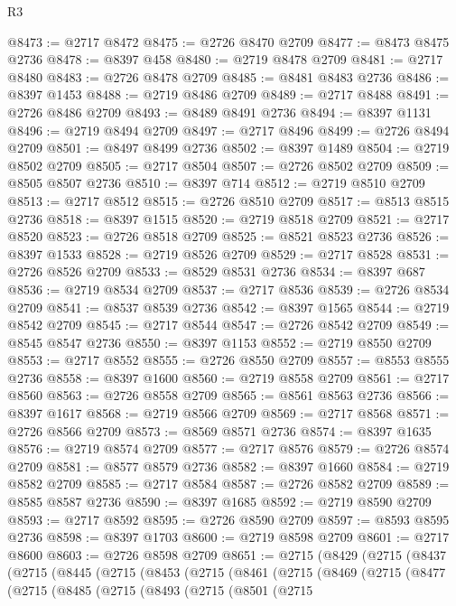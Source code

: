 \begin{lexlean}{R3}
\begin{coremodule}
@8473 := @2717 @8472
@8475 := @2726 @8470 @2709
@8477 := @8473 @8475 @2736
@8478 := @8397 @458
@8480 := @2719 @8478 @2709
@8481 := @2717 @8480
@8483 := @2726 @8478 @2709
@8485 := @8481 @8483 @2736
@8486 := @8397 @1453
@8488 := @2719 @8486 @2709
@8489 := @2717 @8488
@8491 := @2726 @8486 @2709
@8493 := @8489 @8491 @2736
@8494 := @8397 @1131
@8496 := @2719 @8494 @2709
@8497 := @2717 @8496
@8499 := @2726 @8494 @2709
@8501 := @8497 @8499 @2736
@8502 := @8397 @1489
@8504 := @2719 @8502 @2709
@8505 := @2717 @8504
@8507 := @2726 @8502 @2709
@8509 := @8505 @8507 @2736
@8510 := @8397 @714
@8512 := @2719 @8510 @2709
@8513 := @2717 @8512
@8515 := @2726 @8510 @2709
@8517 := @8513 @8515 @2736
@8518 := @8397 @1515
@8520 := @2719 @8518 @2709
@8521 := @2717 @8520
@8523 := @2726 @8518 @2709
@8525 := @8521 @8523 @2736
@8526 := @8397 @1533
@8528 := @2719 @8526 @2709
@8529 := @2717 @8528
@8531 := @2726 @8526 @2709
@8533 := @8529 @8531 @2736
@8534 := @8397 @687
@8536 := @2719 @8534 @2709
@8537 := @2717 @8536
@8539 := @2726 @8534 @2709
@8541 := @8537 @8539 @2736
@8542 := @8397 @1565
@8544 := @2719 @8542 @2709
@8545 := @2717 @8544
@8547 := @2726 @8542 @2709
@8549 := @8545 @8547 @2736
@8550 := @8397 @1153
@8552 := @2719 @8550 @2709
@8553 := @2717 @8552
@8555 := @2726 @8550 @2709
@8557 := @8553 @8555 @2736
@8558 := @8397 @1600
@8560 := @2719 @8558 @2709
@8561 := @2717 @8560
@8563 := @2726 @8558 @2709
@8565 := @8561 @8563 @2736
@8566 := @8397 @1617
@8568 := @2719 @8566 @2709
@8569 := @2717 @8568
@8571 := @2726 @8566 @2709
@8573 := @8569 @8571 @2736
@8574 := @8397 @1635
@8576 := @2719 @8574 @2709
@8577 := @2717 @8576
@8579 := @2726 @8574 @2709
@8581 := @8577 @8579 @2736
@8582 := @8397 @1660
@8584 := @2719 @8582 @2709
@8585 := @2717 @8584
@8587 := @2726 @8582 @2709
@8589 := @8585 @8587 @2736
@8590 := @8397 @1685
@8592 := @2719 @8590 @2709
@8593 := @2717 @8592
@8595 := @2726 @8590 @2709
@8597 := @8593 @8595 @2736
@8598 := @8397 @1703
@8600 := @2719 @8598 @2709
@8601 := @2717 @8600
@8603 := @2726 @8598 @2709
@8651 := @2715
    (@8429
      (@2715
        (@8437
          (@2715
            (@8445
              (@2715
                (@8453
                  (@2715
                    (@8461
                      (@2715
                        (@8469
                          (@2715
                            (@8477
                              (@2715
                                (@8485
                                  (@2715
                                    (@8493
                                      (@2715
                                        (@8501
                                          (@2715

\end{coremodule}
\end{lexlean}
